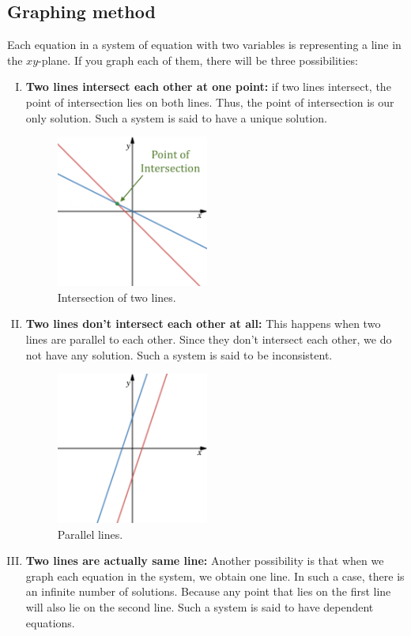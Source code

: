 \subsection{Graphing method}
Each equation in a system of equation with two variables is representing a line in the $xy$-plane. If you graph each of them, there will be three possibilities:
\begin{enumerate}[I.]
	\item \textbf{Two lines intersect each other at one point:} if two lines intersect, the point of intersection lies on both lines. Thus, the point of intersection is our only solution. Such a system is said to have a unique solution.
		\begin{figure}[H]
			 \includegraphics[width=5cm]{pics/line_intersect.png}
			 \centering
			 \caption{Intersection of two lines.}
			 \label{fig:line_intersect}
		\end{figure}
	\item \textbf{Two lines don’t intersect each other at all:} This happens when two lines are parallel to each other. Since they don’t intersect each other, we do not have any solution. Such a system is said to be inconsistent.
		\begin{figure}[H]
			 \includegraphics[width=5cm]{pics/line_parallel.png}
			 \centering
			 \caption{Parallel lines.}
			 \label{fig:line_parallel}
		\end{figure}
	\item \textbf{Two lines are actually same line:} Another possibility is that when we graph each equation in the system, we obtain one line. In such a case, there is an infinite number of solutions. Because any point that lies on the first line will also lie on the second line. Such a system is said to have dependent equations.

\end{enumerate}

